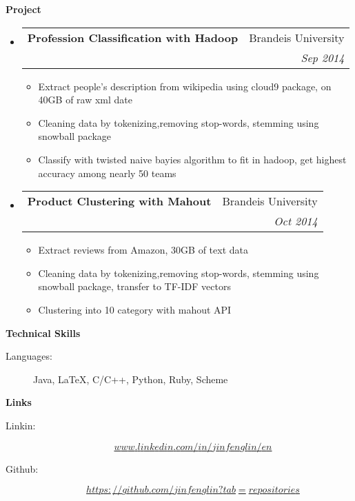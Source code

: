 \documentclass[letterpaper,11pt]{article}
\makeatletter
\newcommand{\resitem}[1]{\item #1 \vspace{-2pt}}
\newcommand{\resheading}[1]{{\large \colorbox{mygrey}{\begin{minipage}{\textwidth}{\textbf{#1 \vphantom{p\^{E}}}}\end{minipage}}}}
\newcommand{\ressubheading}[4]{
\begin{tabular*}{6.5in}{l@{\extracolsep{\fill}}r}
		\textbf{#1} & #2 \\
		\textit{#3} & \textit{#4} \\
\end{tabular*}\vspace{-6pt}}
\makeatother
\begin{document}
\resheading{Project}
\begin{itemize}
\item
	\ressubheading{Profession Classification with Hadoop}{Brandeis University}{}{Sep 2014}
	\begin{itemize}
		\resitem{ Extract people's description from wikipedia using cloud9 package, on 40GB of raw xml date}
		\resitem{ Cleaning data by tokenizing,removing stop-words, stemming using snowball package}
		\resitem{ Classify with twisted naive bayies algorithm to fit in hadoop, get highest accuracy among nearly 50 teams}
	\end{itemize}

\item
	\ressubheading{Product Clustering with Mahout}{Brandeis University}{}{Oct 2014}
	\begin{itemize}
		\resitem{ Extract reviews from Amazon, 30GB of text data }
		\resitem{ Cleaning data by tokenizing,removing stop-words, stemming using snowball package, transfer to TF-IDF vectors}
		\resitem{ Clustering into 10 category with mahout API}
	\end{itemize}
\end {itemize}


\resheading{Technical Skills}

\begin{description}
\item[Languages:]
Java, \LaTeX, C/C++, Python, Ruby, Scheme
\end{description}

\resheading{Links}
\begin{description}
\item[Linkin:] \href{www.linkedin.com/in/jinfenglin/en}{$$www.linkedin.com/in/jinfenglin/en$$ }
\item[Github:] \href{https://github.com/jinfenglin?tab=repositories}{$$https://github.com/jinfenglin?tab=repositories$$}
\end{description}
\end{document}
